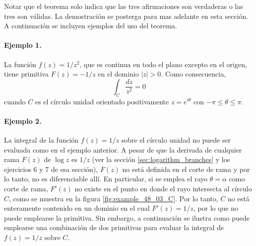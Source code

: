 \documentclass[a4paper]{report}
\begin{document}
Notar que el teorema solo indica que las tres afirmaciones son verdaderas o las tres son válidas. La demostración se posterga para mas adelante en esta sección. A continuación se incluyen ejemplos del uso del teorema.

\paragraph{Ejemplo 1.} La función \(f(z)=1/z^2\), que es continua en todo el plano excepto en el origen, tiene primitiva \(F(z)=-1/z\) en el dominio \(|z|>0\). Como consecuencia,
\[
 \int_C\frac{dz}{z^2}=0
\]
cuando \(C\) es el círculo unidad orientado positivamente \(z=e^{i\theta}\) con \(-\pi\leq\theta\leq\pi\).  

\paragraph{Ejemplo 2.} La integral de la función \(f(z)=1/z\) sobre el círculo unidad no puede ser evaluada como en el ejemplo anterior. A pesar de que la derivada de cualquier rama \(F(z)\) de \(\log z\) es \(1/z\) (ver la sección \ref{sec:logarithm_branches} y los ejercicios 6 y 7 de esa sección), \(F(z)\) no está definida en el corte de rama y por lo tanto, no es diferenciable allí. En particular, si se emplea el rayo \(\theta=\alpha\) como corte de rama, \(F'(z)\) no existe en el punto en donde el rayo intersecta al círculo \(C\), como se muestra en la figura \ref{fig:example_48_03_C}. Por lo tanto, \(C\) no está enteramente contenido en un dominio en el cual \(F'(z)=1/z\), por lo que no puede emplearse la primitiva. Sin embargo, a continuación se ilustra como puede emplearse una combinación de dos primitivas para evaluar la integral de \(f(z)=1/z\) sobre \(C\). 
\end{document}
